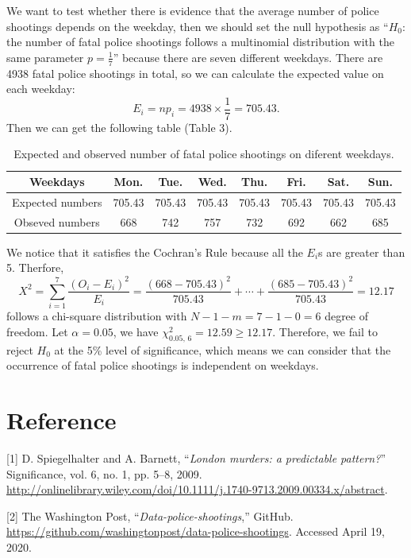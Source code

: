 \documentclass[a4paper]{article}
\begin{document}
We want to test whether there is evidence that the average number of police shootings depends on the weekday, then we should set the null hypothesis as “$H_0$: the number of fatal police shootings follows a multinomial distribution with the same parameter $p=\frac{1}{7}$” because there are seven different weekdays. There are 4938 fatal police shootings in total, so we can calculate the expected value on each weekday:
$$E_i=np_i=4938\times\frac{1}{7}=705.43.$$
Then we can get the following table (Table 3).
\begin{table}[H]
\centering
\begin{spacing}{1.10}
\begin{tabular}{|c|c|c|c|c|c|c|c|}
\hline
Weekdays         & Mon.   & Tue.   & Wed.   & Thu.  & Fri.   & Sat.   & Sun.   \\ \hline
Expected numbers & 705.43 & 705.43 & 705.43 & 705.43 & 705.43 & 705.43 & 705.43 \\ \hline
Obseved numbers  & 668    & 742    & 757    & 732    & 692    & 662    & 685    \\ \hline
\end{tabular}
\end{spacing}
\caption{Expected and observed number of fatal police shootings on diferent weekdays.}
\end{table}

We notice that it satisfies the Cochran's Rule because all the $E_i$s are greater than 5. Therfore,
$$X^2=\sum_{i=1}^7\frac{(O_i-E_i)^2}{E_i}=\frac{(668-705.43)^2}{705.43}+\cdots+\frac{(685-705.43)^2}{705.43}=12.17$$ follows a chi-square distribution with $N-1-m=7-1-0=6$ degree of freedom. Let $\alpha=0.05$, we have $\chi_{0.05,\,6}^2=12.59\ge12.17$. Therefore, we fail to reject $H_0$ at the 5\% level of significance, which means we can consider that the occurrence of fatal police shootings is independent on weekdays.




\section{Reference}
[1] D. Spiegelhalter and A. Barnett, “\textit{London murders: a predictable pattern?}” Significance, vol. 6, no. 1, pp. 5–8, 2009. \url{http://onlinelibrary.wiley.com/doi/10.1111/j.1740-9713.2009.00334.x/abstract}.

[2] The Washington Post, “\textit{Data-police-shootings},” GitHub. \url{https://github.com/washingtonpost/data-police-shootings}. Accessed April 19, 2020.
\end{document}
